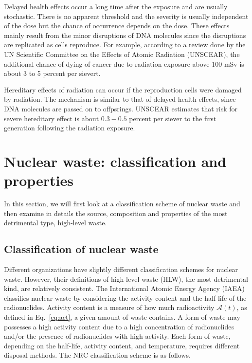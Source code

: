 \documentclass[nofootinbib,preprint,aps]{revtex4-1}
\begin{document}
        Delayed health effects occur a long time after the exposure and are usually stochastic. There is
        no apparent threshold and the severity is usually independent of the dose but
        the chance of occurrence depends on the dose.\cite{u16}
        These effects mainly result from the minor disruptions of DNA molecules since the disruptions are replicated
        as cells reproduce.
        For example, according to a review done by the UN Scientific Committee on the Effects of Atomic Radiation
        (UNSCEAR), the additional chance of dying of cancer due to radiation exposure above $100$ mSv is
        about 3 to 5 percent per sievert.\cite{unscear16}

        Hereditary effects of radiation can occur if the reproduction cells were damaged by radiation.
        The mechanism is similar to that of delayed health effects, since DNA molecules are passed on
        to offpsrings.
        UNSCEAR estimates that risk for severe hereditary effect is about $0.3-0.5$ percent per siever to
        the first generation following the radiation exposure.\cite{u16, unscear16}
\section{Nuclear waste: classification and properties}
\label{sec:waste}
    In this section, we will first look at a classification scheme of nuclear waste and then
    examine in details the source, composition and properties of the most detrimental type, high-level waste.
    \subsection{Classification of nuclear waste}
    \label{sec:waste:classification}
    Different organizations have slightly different classification schemes for nuclear waste.
    However, their definitions of high-level waste (HLW), the most detrimental kind, are relatively consistent.
    The International Atomic Energy Agency (IAEA) classifies nuclear waste by considering the activity
    content and the half-life of the radionuclides.
    Activity content is a measure of how much radioactivity $\mathcal{A}(t)$, as defined in Eq.~\ref{eq:act},
    a given amount of waste contains.
    A form of waste may possesses a high activity content due to
    a high concentration of radionuclides and/or the presence of radionuclides with high activity.\cite{iaea09}
    Each form of waste, depending on the half-life, activity content, and temperature, requires different
    disposal methods. The NRC classification scheme is as follows.\cite{nrc09}
\end{document}
